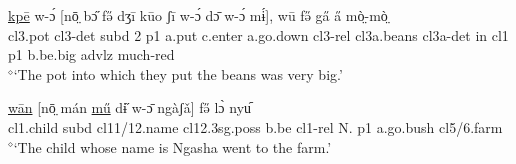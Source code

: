 \documentclass[10pt,twoside]{article}
\def\ci#1{{\ipaFont #1}}
\newcommand{\gl}[1]{`#1'}
\def\VSP{\vspace{0pt}}
\newcommand{\cl}[1]{{\sc cl#1}}
\def\elicited{$^\diamond$}
\newcommand{\comment}[1]{\textcolor{blue}{\emph{#1}}}
\begin{document}
\begin{exe}
	\ex \label{exThePotIntoWhich}	
		\gll \uline{kpē} w-ɔ́ [nō̤ bɔ̋ fə̋ dʒī kūo ʃī w-ɔ́ dɔ̄ w-ɔ́ mɨ́], wū fə̋ ga̋ a̋ mò̤-mò̤	\\
		\cl3.pot \cl3-{\sc det} {\sc subd} 2  {\sc p1} a.put c.enter a.go.down \cl3-{\sc rel} \cl3a.beans \cl3a-{\sc det} in \cl1  {\sc p1} b.be.big {\sc advlz} much-{\sc red} 	\\
		\glt \VSP \elicited \gl{The pot into which they put the beans was very big.}
\end{exe}%
%

\begin{exe} 
	\ex \label{exChildWhoseName}	

		\gll	\uline{wān} [nō̤ mán \uline{mű} dɨ̋ w-ɔ̄ ngàʃǎ] fə̋ lɔ̀ nyu᷇				\\
			\cl1.child {\sc subd} \cl11/12.name \cl12.{\sc 3sg.poss} b.be \cl1-{\sc rel} N. {\sc p1} a.go.bush \cl5/6.farm		\\
		\glt \VSP \elicited \gl{The child whose name is Ngasha went to the farm.}
	
\end{exe}%
%
%
%
%
\end{document}
